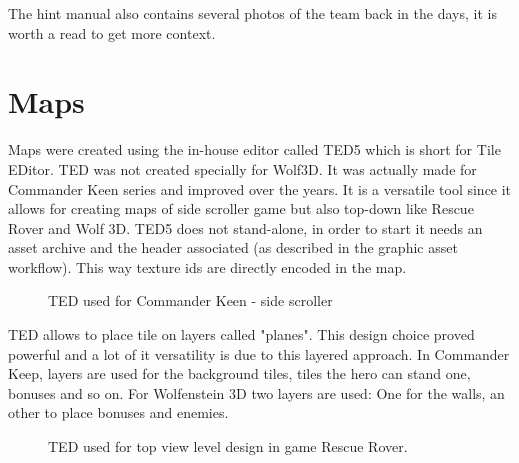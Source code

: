 \documentclass[book.tex]{subfiles}
\begin{document}
     \begin{figure}[H]
\centering
   \end{figure}


\par 
The hint manual also contains several photos of the team back in the days, it is worth a read to get more context.













\section{Maps}
Maps were created using the in-house editor called TED5 which is short for Tile EDitor. TED was not created specially for Wolf3D. It was actually made for Commander Keen series and improved over the years. It is a versatile tool since it allows for creating maps of side scroller game but also top-down like Rescue Rover and Wolf 3D. TED5 does not stand-alone, in order to start it needs an asset archive and the header associated (as described in the graphic asset workflow). This way texture ids are directly encoded in the map.\\

 \begin{figure}[H]
\centering
 \end{figure}

  \begin{figure}[H]
\centering
 \end{figure}


 \begin{figure}[H]
\centering
 \caption{TED used for Commander Keen - side scroller} 
 \end{figure}

TED allows to place tile on layers called "planes". This design choice proved powerful and a lot of it versatility is due to this layered approach. In Commander Keep, layers are used for the background tiles, tiles the hero can stand one, bonuses and so on. For Wolfenstein 3D two layers are used: One for the walls, an other to place bonuses and enemies.\\
\begin{figure}[H]
\centering
 \caption{TED used for top view level design in game Rescue Rover.} 
 \end{figure}
\end{document}
